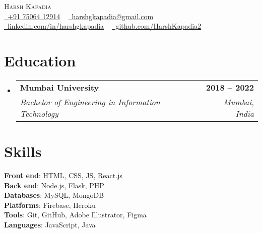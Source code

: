 \documentclass[letterpaper,11pt]{article}
\makeatletter
\newcommand{\resumeSubheading}[4]{
  \vspace{-2pt}\item
    \begin{tabular*}{1.0\textwidth}[t]{l@{\extracolsep{\fill}}r}
      \textbf{#1} & \textbf{\small #2} \\
      \textit{\small#3} & \textit{\small #4} \\
    \end{tabular*}\vspace{-7pt}
}
\newcommand{\resumeSubHeadingListStart}{\begin{itemize}[leftmargin=0.0in, label={}]}
\newcommand{\resumeSubHeadingListEnd}{\end{itemize}}
\makeatother
\begin{document}

\begin{center}
    {\Huge \scshape Harsh Kapadia} \\ \vspace{2pt}
    \small
    \faPhone \href{mailto:harshgkapadia@gmail.com}{\raisebox{-0.1\height}\ +91 75064 12914} ~ \faEnvelope \href{mailto:harshgkapadia@gmail.com}{\raisebox{-0.2\height}\  harshgkapadia@gmail.com} ~ 
    \faLinkedin \href{https://linkedin.com/in/harshgkapadia/}{\raisebox{-0.2\height}\ linkedin.com/in/harshgkapadia} ~
    \faGithub \href{https://github.com/HarshKapadia2}{\raisebox{-0.2\height}\ github.com/HarshKapadia2}
    \vspace{-8pt}
\end{center}


\section{Education}
  \resumeSubHeadingListStart
    \resumeSubheading
        {Mumbai University}{2018 -- 2022}
        {Bachelor of Engineering in Information Technology}{Mumbai, India}
    \resumeSubHeadingListEnd


\section{Skills}
    \begin{itemize}[leftmargin=0.2in, label={}]
    {\item{
        \textbf{Front end}: HTML, CSS, JS, React.js \\
        \textbf{Back end}: Node.js, Flask, PHP \\
        \textbf{Databases}: MySQL, MongoDB \\
        \textbf{Platforms}: Firebase, Heroku \\
        \textbf{Tools}: Git, GitHub, Adobe Illustrator, Figma \\
        \textbf{Languages}: JavaScript, Java
    }}
    \end{itemize}
\vspace{-16pt}
\end{document}
